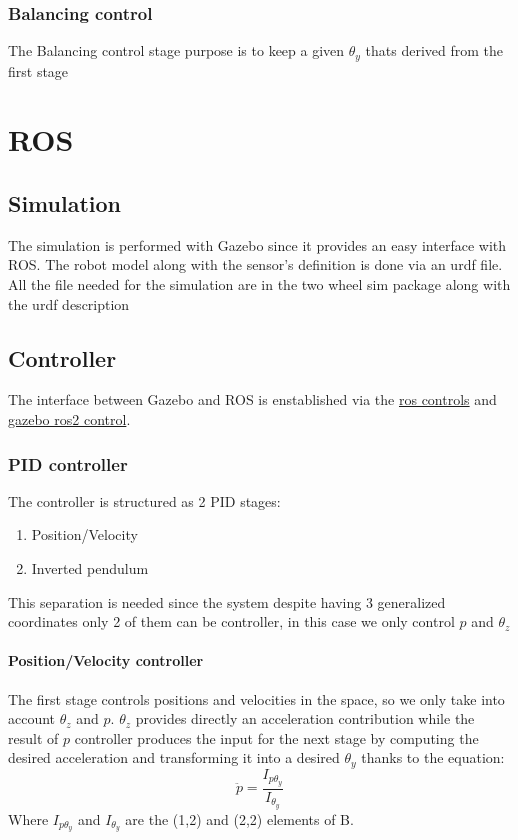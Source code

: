 \documentclass[a4paper, 7px]{article}
\begin{document}
\subsubsection{Balancing control}
The Balancing control stage purpose is to keep a given $\theta_y$ thats derived from the first stage



\section{ROS}

\subsection{Simulation}

The simulation is performed with Gazebo since it provides an easy interface with ROS.
The robot model along with the sensor's definition is done via an urdf file.
All the file needed for the simulation are in the two wheel sim package along with the urdf description

\subsection{Controller}
The interface between Gazebo and ROS is enstablished via the \href{https://github.com/ros-controls/ros2_control}{ros controls} 
and \href{https://github.com/ros-controls/gazebo_ros2_control}{gazebo ros2 control}.

\subsubsection{PID controller}
The controller is structured as 2 PID stages:
\begin{enumerate}
	\item Position/Velocity
	\item Inverted pendulum
\end{enumerate}

This separation is needed since the system despite having 3 generalized coordinates only 2 of them can be controller, in this case we only control $p$ and $\theta_z$

\paragraph{Position/Velocity controller}
The first stage controls positions and velocities in the space, so we only take into account $\theta_z$ and $p$.
$\theta_z$ provides directly an acceleration contribution while the result of $p$ controller produces the input for the next stage by computing the desired acceleration and transforming it into a desired $\theta_y$ thanks to the equation:
$$\ddot p = \frac{I_{p\theta_y}}{I_{\theta_y}}$$
Where $I_{p\theta_y}$ and $I_{\theta_y}$ are the (1,2) and (2,2) elements of B.
\end{document}

